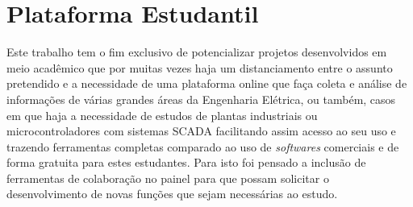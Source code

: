 \section{Plataforma Estudantil}
\label{sec:plataforma-estudantil}

    Este trabalho tem o fim exclusivo de potencializar projetos desenvolvidos em meio acadêmico que por muitas vezes haja um distanciamento entre o assunto pretendido e a necessidade de uma plataforma online que faça coleta e análise de informações de várias grandes áreas da Engenharia Elétrica, ou também, casos em que haja a necessidade de estudos de plantas industriais ou microcontroladores com sistemas \gls{SCADA} facilitando assim acesso ao seu uso e trazendo ferramentas completas comparado ao uso de \textit{softwares} comerciais e de forma gratuita para estes estudantes. Para isto foi pensado a inclusão de ferramentas de colaboração no painel para que possam solicitar o desenvolvimento de novas funções que sejam necessárias ao estudo.